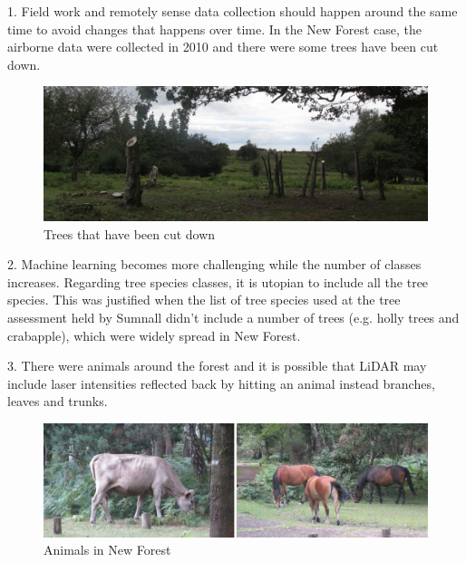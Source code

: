 \documentclass{subfiles}
\begin{document}
    \par 1.	Field work and remotely sense data collection should happen around the same time to avoid changes that happens over time. In the New Forest case, the airborne data were collected in 2010 and there were some trees have been cut down.
    
    \begin{figure} [!h]
    	\centering
    	\includegraphics[width=\textwidth]{img/NewForest/CC_TreesCutDown}
    	\caption{Trees that have been cut down}
    	\label{fig:CC_TreesCutDown}
    \end{figure}

    
    \par 2.	Machine learning becomes more challenging while the number of classes increases. Regarding tree species classes, it is utopian to include all the tree species. This was justified when the list of tree species used at the tree assessment held by Sumnall \cite{Sumnall2013} didn’t include a number of trees (e.g. holly trees and crabapple), which were widely spread in New Forest. 
    
    \par 3.	There were animals around the forest and it is possible that LiDAR may include laser intensities reflected back by hitting an animal instead branches, leaves and trunks. 
    
        \begin{figure} [!h]
        	\centering
        	\includegraphics[width=\textwidth]{img/NewForest/CC_Animals}
        	\caption{Animals in New Forest}
        	\label{fig:CC_Animals}
        \end{figure}
        
\end{document}
